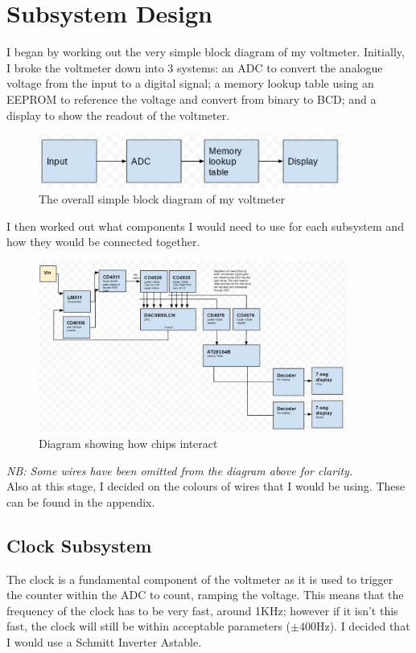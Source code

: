 \chapter{Subsystem Design}
I began by working out the very simple block diagram of my voltmeter. \newline
Initially, I broke the voltmeter down into 3 systems: an ADC to convert the analogue voltage from the input to a digital signal; a memory lookup table using an EEPROM to reference the voltage and convert from binary to BCD; and a display to show the readout of the voltmeter.
\begin{figure} [H]
    \centering
    \includegraphics[width=10cm]{images/simpleBlockDiagram.png}
    \caption{The overall simple block diagram of my voltmeter}
    \label{fig:simpleBlockDiagram}
\end{figure}
\noindent I then worked out what components I would need to use for each subsystem and how they would be connected together.
\begin{figure} [H]
    \centering
    \includegraphics[width=0.9\textwidth]{images/blockDiagram3Updated.jpg}
    \caption{Diagram showing how chips interact}
    \label{fig:blockDiagramSubsystems}
\end{figure}
\noindent\textit{NB: Some wires have been omitted from the diagram above for clarity.}\\
\noindent Also at this stage, I decided on the colours of wires that I would be using. These can be found in the appendix.


\section{Clock Subsystem}
The clock is a fundamental component of the voltmeter as it is used to trigger the counter within the ADC to count, ramping the voltage. This means that the frequency of the clock has to be very fast, around 1KHz; however if it isn't this fast, the clock will still be within acceptable parameters ($\pm400\mathrm{Hz}$). I decided that I would use a Schmitt Inverter Astable.
